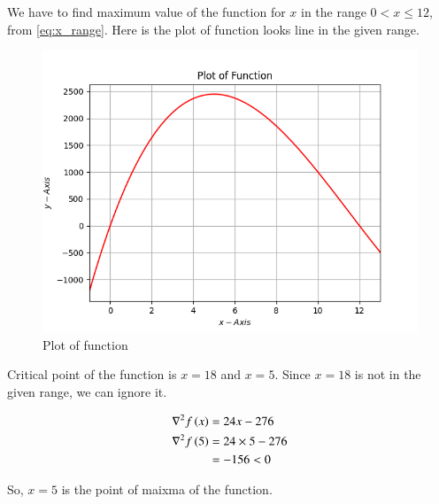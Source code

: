 \documentclass[journal,12pt,twocolumn]{IEEEtran}
\begin{document}
We have to find maximum value of the function for $x$ in the range $0 < x \leq 12$, from \eqref{eq:x_range}.
Here is the plot of function looks line in the given range.

\begin{figure}[!htb]
    \centering
    \includegraphics[width=\columnwidth]{figs/plot.png}
    \caption{Plot of function}
    \label{fig:plot of function}
\end{figure}

Critical point of the function is $x=18$ and $x=5$.
Since $x=18$ is not in the given range, we can ignore it.

\begin{align}
    \nabla^2 f\left(x\right) &= 24x - 276\\
    \nabla^2 f\left(5\right) &= 24 \times 5 - 276\\ 
    &= -156 < 0
\end{align}

So, $x=5$ is the point of maixma of the function.
\end{document}
